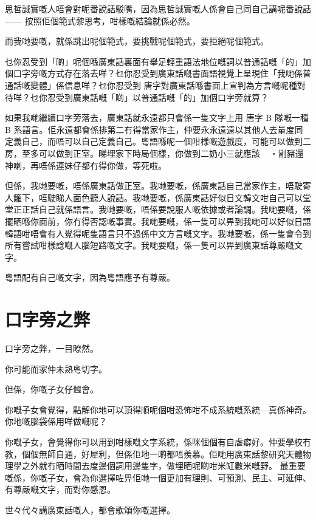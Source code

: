 思哲誠實嘅人唔會對呢番說話駁嘴，因為思哲誠實嘅人係會自己同自己講呢番說話—— 按照佢個範式黎思考，咁樣嘅結論就係必然。

而我哋要嘅，就係跳出呢個範式，要挑戰呢個範式，要拒絕呢個範式。

乜你忍受到「啲」呢個喺廣東話裏面有舉足輕重語法地位嘅詞以普通話嘅「的」加個口字旁嘅方式存在落去咩？乜你忍受到廣東話嘅書面語視覺上呈現住「我哋係普通話嘅變體」係信息咩？乜你忍受到 唐字對廣東話喺書面上宣判為方言嘅呢種對待咩？乜你忍受到廣東話嘅「啲」以普通話嘅「的」加個口字旁就算？

如果我哋繼續口字旁落去，廣東話就永遠都只會係一隻文字上用 唐字 B 隊嘅一種 B 系語言。佢永遠都會係排第二冇得當家作主，仲要永永遠遠以其他人去量度同定義自己，而唔可以自己定義自己。粵語喺呢一個咁樣嘅遊戲度，可能可以做到二房，至多可以做到正室。睇埋家下時局個樣，你做到二奶小三就應該・劏豬還神喇，再唔係連妹仔都冇得你做，等死啦。

但係，我哋要嘅，唔係廣東話做正室。我哋要嘅，係廣東話自己當家作主，唔駛寄人籬下，唔駛睇人面色聽人說話。我哋要嘅，係廣東話好似日文韓文咁自己可以堂堂正正話自己就係語言。我哋要嘅，唔係要說服人嘅依據或者論調。我哋要嘅，係擺晒喺你面前，你冇得否認嘅事實。我哋要嘅，係一隻可以畀到我哋可以好似日語韓語咁唔會有人覺得呢隻語言只不過係中文方言嘅文字。我哋要嘅，係一隻會令到所有嘗試咁樣諗嘅人腦短路嘅文字。我哋要嘅，係一隻可以畀到廣東話尊嚴嘅文字。

粵語配有自己嘅文字，因為粵語應予有尊嚴。


\section{口字旁之弊}
口字旁之弊，一目瞭然。

你可能而家仲未熟粵切字。

但係，你嘅子女仔乸會。

你嘅子女會覺得，點解你地可以頂得順呢個咁恐怖咁不成系統嘅系統—真係神奇。你地嘅腦袋係用咩做嘅呢？

你嘅子女，會覺得你可以用到咁樣嘅文字系統，係咪個個有自虐癖好。仲要學校冇教，個個無師自通，好犀利，但係佢地一啲都唔羨慕。佢哋用廣東話黎研究天體物理學之外就冇晒時間去度邊個詞用邊隻字，做埋晒呢啲咁米缸數米嘅野。
最重要嘅係，你嘅子女，會為你選擇咗畀佢哋一個更加有理則、可預測、民主、可延伸、有尊嚴嘅文字，而對你感恩。

世々代々講廣東話嘅人，都會歌頌你嘅選擇。
